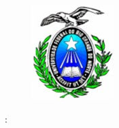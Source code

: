

\thispagestyle{empty}

\begin{figure}
    \centering
    \includegraphics[]{lib/Logoufrn.jpg}
\end{figure}

\begin{center}
    \large{\imprimirinstituicao}
    
    
    \large{\MakeUppercase{\imprimirtitulo: \imprimirsubtitulo}}
    
    
    \large{\MakeUppercase{\textbf{\imprimirautor}}}
    
    
    \large{\imprimirlocal} \\
    \large{\imprimirdata}
\end{center}

\newpage
